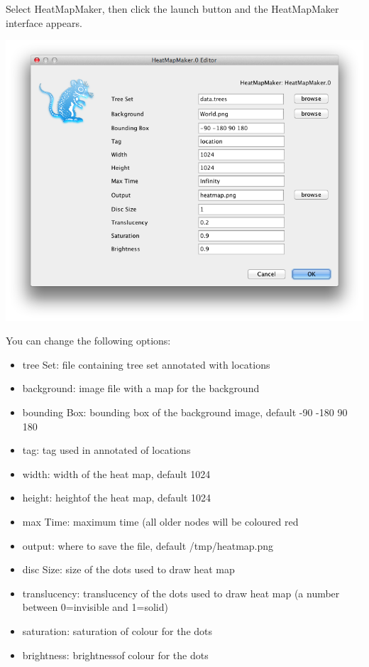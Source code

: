 \documentclass{article}
\begin{document}
Select HeatMapMaker, then click the launch button and the HeatMapMaker interface appears.

\includegraphics[scale=0.4]{figures/HeatMapMaker}

You can change the following options:

\begin{itemize}
\item tree Set: file containing tree set annotated with locations
\item background: image file with a map for the background
\item bounding Box: bounding box of the background image, default -90 -180 90 180
\item tag: tag used in annotated of locations
\item width: width of the heat map, default 1024
\item height: heightof the heat map, default 1024
\item max Time: maximum time (all older nodes will be coloured red 
\item output: where to save the file, default /tmp/heatmap.png
\item disc Size: size of the dots used to draw heat map
\item translucency: translucency of the dots used to draw heat map (a number between 0=invisible and 1=solid)
\item saturation: saturation of colour for the dots
\item brightness: brightnessof colour for the dots 
\end{itemize}
\end{document}
